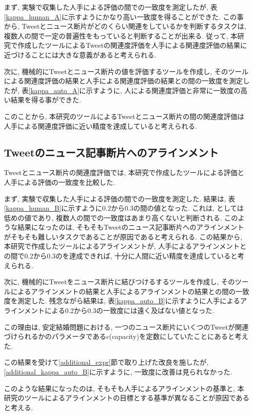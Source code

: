 \documentclass[12pt]{jarticle}
\begin{document}
まず, 実験で収集した人手による評価の間での一致度を測定したが, 表\ref{kappa_human_A}に示すようにかなり高い一致度を得ることができた.
この事から, Tweetとニュース断片がどのくらい関連をしているかを判断するタスクは, 複数人の間で一定の普遍性をもっていると判断することが出来る.
従って, 本研究で作成したツールによるTweetの関連度評価を人手による関連度評価の結果に近づけることには大きな意義があると考えられる.

次に, 機械的にTweetとニュース断片の値を評価するツールを作成し, そのツールによる関連度評価の結果と人手による関連度評価の結果との間の一致度を測定したが, 表\ref{kappa_auto_A}に示すように, 人による関連度評価と非常に一致度の高い結果を得る事ができた.

このことから, 本研究のツールによるTweetとニュース断片の間の関連度評価は人手による関連度評価に近い精度を達成していると考えられる.

\subsection{Tweetのニュース記事断片へのアラインメント}
Tweetとニュース断片の関連度評価では, 本研究で作成したツールによる評価と人手による評価の一致度を比較した.

まず, 実験で収集した人手による評価の間での一致度を測定した. 結果は, 表\ref{kappa_human_B}に示すように0.2から0.3の間の値となった.
これは, \kappac としては低めの値であり, 複数人の間での一致度はあまり高くないと判断される.
このような結果になったのは, そもそもTweetのニュース記事断片へのアラインメントがそもそも難しいタスクであることが原因であると考えられる.
この結果から, 本研究で作成したツールによるアラインメントが, 人手によるアラインメントとの間で0.2から0.3の\kappac を達成できれば, 十分に人間に近い精度を達成していると考えられる.

次に, 機械的にTweetをニュース断片に結びつけるするツールを作成し, そのツールによるアラインメントの結果と人手によるアラインメントの結果との間の一致度を測定した. 残念ながら結果は, 表\ref{kappa_auto_B}に示すように人手によるアラインメントによる0.2から0.3の一致度には遠く及ばない値となった.

この理由は, 安定結婚問題における, 一つのニュース断片にいくつのTweetが関連づけられるかのパラメータである$c$(capacity)を定数にしていたことにあると考えた.

この結果を受けて\ref{additional_expr}節で取り上げた改良を施したが, \ref{additional_kappa_auto_B}に示すように, 一致度に改善は見られなかった.

このような結果になったのは, そもそも人手によるアラインメントの基準と, 本研究のツールによるアラインメントの目標とする基準が異なることが原因であると考える.
\end{document}
